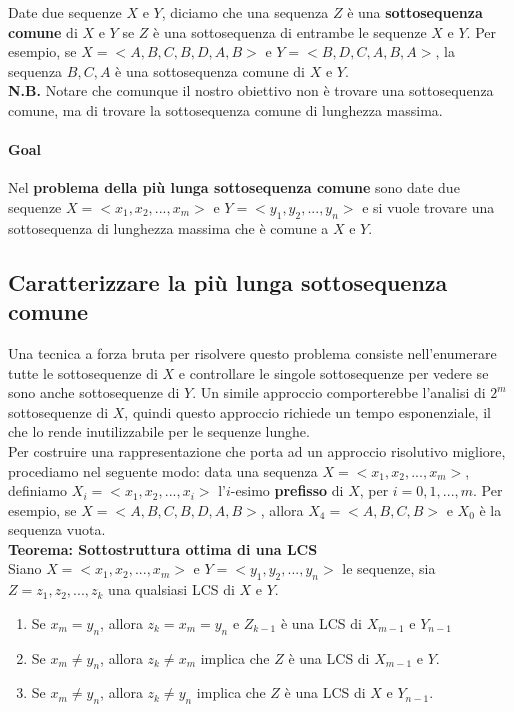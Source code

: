 Date due sequenze $X$ e $Y$, diciamo che una sequenza $Z$ è una
\textbf{sottosequenza comune} di $X$ e $Y$ se $Z$ è una
sottosequenza di entrambe le sequenze $X$ e $Y$. Per esempio, se
$X = <A,B,C,B,D,A,B>$ e $Y = <B,D,C,A,B,A>$, la sequenza $B,C,A$ è
una sottosequenza comune di $X$ e $Y$.\\

\textbf{N.B.} Notare che comunque il nostro obiettivo non è trovare una
sottosequenza comune, ma di trovare la sottosequenza comune di lunghezza
massima.

\paragraph{Goal}

Nel \textbf{problema della più lunga sottosequenza comune} sono date due
sequenze $X = <x_1, x_2, ..., x_m>$ e $Y = <y_1, y_2, ..., y_n>$ e
si vuole trovare una sottosequenza di lunghezza massima che è comune a
$X$ e $Y$.

\subsection{Caratterizzare la più lunga sottosequenza comune}

Una tecnica a forza bruta per risolvere questo problema consiste
nell'enumerare tutte le sottosequenze di $X$ e controllare le singole
sottosequenze per vedere se sono anche sottosequenze di $Y$. Un simile
approccio comporterebbe l'analisi di $2^m$ sottosequenze di $X$,
quindi questo approccio richiede un tempo esponenziale, il che lo rende
inutilizzabile per le sequenze lunghe.\\

Per costruire una rappresentazione che porta ad un approccio risolutivo
migliore, procediamo nel seguente modo: data una sequenza
$X = <x_1, x_2, ..., x_m>$, definiamo $X_i = <x_1, x_2, ..., x_i>$
l'$i$-esimo \textbf{prefisso} di $X$, per $i=0,1,...,m$. Per
esempio, se $X = <A,B,C,B,D,A,B>$, allora $X_4 = <A,B,C,B>$ e
$X_0$ è la sequenza vuota.\\

\textbf{Teorema: Sottostruttura ottima di una LCS}\\

Siano $X = <x_1, x_2, ..., x_m>$ e $Y = <y_1, y_2, ..., y_n>$ le
sequenze, sia $Z = z_1, z_2, ..., z_k$ una qualsiasi LCS di $X$ e
$Y$.

\begin{enumerate}
	\item Se $x_m = y_n$, allora $z_k = x_m = y_n$ e $Z_{k-1}$ è
	      una LCS di $X_{m-1}$ e $Y_{n-1}$
	\item Se $x_m \ne y_n$, allora
	      $z_k \ne x_m$ implica che $Z$ è una LCS di $X_{m-1}$ e $Y$.
	\item Se $x_m \ne y_n$, allora $z_k \ne y_n$ implica che $Z$ è una LCS
	      di $X$ e $Y_{n-1}$.
\end{enumerate}


